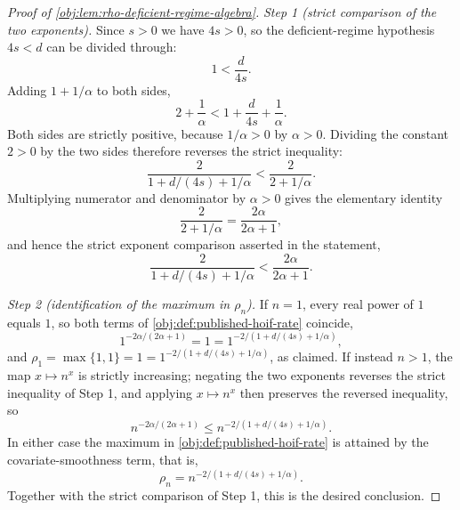 \begin{proof}[Proof of \cref{obj:lem:rho-deficient-regime-algebra}]
\emph{Step 1 (strict comparison of the two exponents).} Since \(s>0\) we have \(4s>0\), so the
deficient-regime hypothesis \(4s<d\) can be divided through:
\[
1<\frac d{4s}.
\]
Adding \(1+1/\alpha\) to both sides,
\[
2+\frac1\alpha
<
1+\frac d{4s}+\frac1\alpha .
\]
Both sides are strictly positive, because \(1/\alpha>0\) by \(\alpha>0\). Dividing the constant
\(2>0\) by the two sides therefore reverses the strict inequality:
\[
\frac{2}{1+d/(4s)+1/\alpha}
<
\frac{2}{2+1/\alpha}.
\]
Multiplying numerator and denominator by \(\alpha>0\) gives the elementary identity
\[
\frac{2}{2+1/\alpha}
=
\frac{2\alpha}{2\alpha+1},
\]
and hence the strict exponent comparison asserted in the statement,
\[
\frac{2}{1+d/(4s)+1/\alpha}
<
\frac{2\alpha}{2\alpha+1}.
\]

\emph{Step 2 (identification of the maximum in \(\rho_n\)).} If \(n=1\), every real power of \(1\)
equals \(1\), so both terms of \cref{obj:def:published-hoif-rate} coincide,
\[
1^{-2\alpha/(2\alpha+1)}=1=1^{-2/(1+d/(4s)+1/\alpha)},
\]
and \(\rho_1=\max\{1,1\}=1=1^{-2/(1+d/(4s)+1/\alpha)}\), as claimed. If instead \(n>1\), the map
\(x\mapsto n^{x}\) is strictly increasing; negating the two exponents reverses the strict inequality
of Step 1, and applying \(x\mapsto n^{x}\) then preserves the reversed inequality, so
\[
n^{-2\alpha/(2\alpha+1)}
\le
n^{-2/(1+d/(4s)+1/\alpha)} .
\]
In either case the maximum in \cref{obj:def:published-hoif-rate} is attained by the
covariate-smoothness term, that is,
\[
\rho_n
=
n^{-2/(1+d/(4s)+1/\alpha)} .
\]
Together with the strict comparison of Step 1, this is the desired conclusion.
\end{proof}
